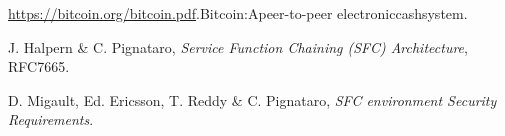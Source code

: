\renewcommand{\bibname}{Bibliographie}
\cleardoublepage
{}
{}
\begin{thebibliography}{99}

  \url{https://bitcoin.org/bitcoin.pdf}.\enspace Bitcoin:\enspace A\enspace peer-to-peer\enspace 
electronic\enspace cash\enspace system.

  J. Halpern \& C. Pignataro,
  \emph{Service Function Chaining (SFC) Architecture}, RFC7665.

D. Migault, Ed. Ericsson, T. Reddy \& C. Pignataro, 
  \emph{ SFC environment Security Requirements}.

\end{thebibliography}
